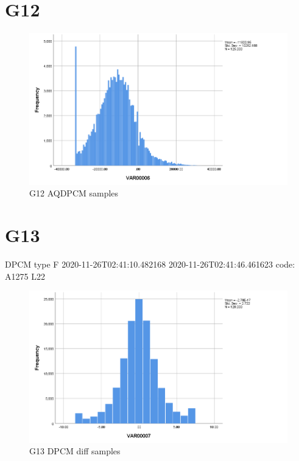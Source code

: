 \documentclass[hidelinks, 12pt, a4paper]{article}
\begin{document}
\section{G12}

\begin{figure}[h!]
	\centering
		\includegraphics[height=.38\textheight, width=\textwidth]{assets/session1/g12.png}
		\caption{G12 AQDPCM  samples}
	\end{figure}

\section{G13}
DPCM type F
2020-11-26T02:41:10.482168
2020-11-26T02:41:46.461623
code: A1275 L22 
\begin{figure}[h!]
	\centering
		\includegraphics[height=.38\textheight, width=\textwidth]{assets/session1/g13.png}
		\caption{G13 DPCM diff samples}
	\end{figure}
\end{document}

